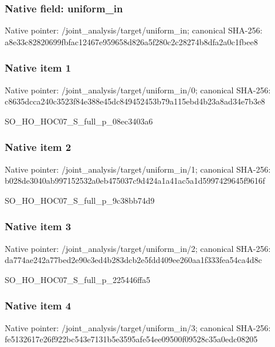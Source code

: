 \documentclass[10pt,a4paper]{article}
\begin{document}
\subsubsection{Native field: uniform\_\allowbreak{}in}
Native pointer: /joint\_\allowbreak{}analysis/target/uniform\_\allowbreak{}in; canonical SHA-256: a8e33c82820699fbfac12467e959658d826a5f280c2c28274b8dfa2a0c1fbee8

\subsubsection{Native item 1}
Native pointer: /joint\_\allowbreak{}analysis/target/uniform\_\allowbreak{}in/0; canonical SHA-256: c8635dcca240c3523f84e388e45dc849452453b79a115ebd4b23a8ad34e7b3e8

\begingroup\raggedright\sloppy SO\_\allowbreak{}HO\_\allowbreak{}HOC07\_\allowbreak{}S\_\allowbreak{}full\_\allowbreak{}p\_\allowbreak{}08ec3403a6\par\endgroup

\subsubsection{Native item 2}
Native pointer: /joint\_\allowbreak{}analysis/target/uniform\_\allowbreak{}in/1; canonical SHA-256: b028de3040ab997152532a0eb475037c9d424a1a41ac5a1d5997429645f9616f

\begingroup\raggedright\sloppy SO\_\allowbreak{}HO\_\allowbreak{}HOC07\_\allowbreak{}S\_\allowbreak{}full\_\allowbreak{}p\_\allowbreak{}9c38bb74d9\par\endgroup

\subsubsection{Native item 3}
Native pointer: /joint\_\allowbreak{}analysis/target/uniform\_\allowbreak{}in/2; canonical SHA-256: da774ae242a77bed2e90c3ed4b283dcb2e5fdd409ee260aa1f333fea54ca4d8c

\begingroup\raggedright\sloppy SO\_\allowbreak{}HO\_\allowbreak{}HOC07\_\allowbreak{}S\_\allowbreak{}full\_\allowbreak{}p\_\allowbreak{}225446ffa5\par\endgroup

\subsubsection{Native item 4}
Native pointer: /joint\_\allowbreak{}analysis/target/uniform\_\allowbreak{}in/3; canonical SHA-256: fe5132617e26f922bc543e7131b5e3595afe54ee09500f09528c35a0edc08205
\end{document}
